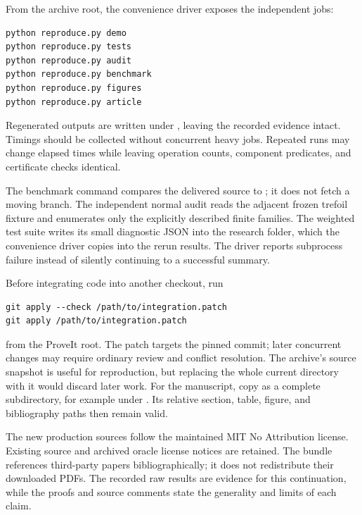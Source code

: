 From the archive root, the convenience driver exposes the independent jobs:
\begin{verbatim}
python reproduce.py demo
python reproduce.py tests
python reproduce.py audit
python reproduce.py benchmark
python reproduce.py figures
python reproduce.py article
\end{verbatim}
Regenerated outputs are written under , leaving the recorded
evidence intact.  Timings should be collected without concurrent heavy
jobs.  Repeated runs may change elapsed times while leaving operation
counts, component predicates, and certificate checks identical.

The benchmark command compares the delivered source to
; it does not fetch a moving branch.
The independent normal audit reads the adjacent frozen trefoil fixture and
enumerates only the explicitly described finite families.  The weighted
test suite writes its small diagnostic JSON into the research folder, which
the convenience driver copies into the rerun results.  The driver reports
subprocess failure instead of silently continuing to a successful summary.

Before integrating code into another checkout, run
\begin{verbatim}
git apply --check /path/to/integration.patch
git apply /path/to/integration.patch
\end{verbatim}
from the ProveIt root.  The patch targets the pinned commit; later
concurrent changes may require ordinary review and conflict resolution.
The archive's source snapshot is useful for reproduction, but replacing
the whole current  directory with it would discard later work.
For the manuscript, copy  as a complete subdirectory, for
example under
.
Its relative section, table, figure, and bibliography paths then remain valid.

The new production sources follow the maintained MIT No Attribution license.
Existing source and archived oracle license notices are retained.  The
bundle references third-party papers bibliographically; it does not
redistribute their downloaded PDFs.  The recorded raw results are evidence
for this continuation, while the proofs and source comments state the
generality and limits of each claim.
